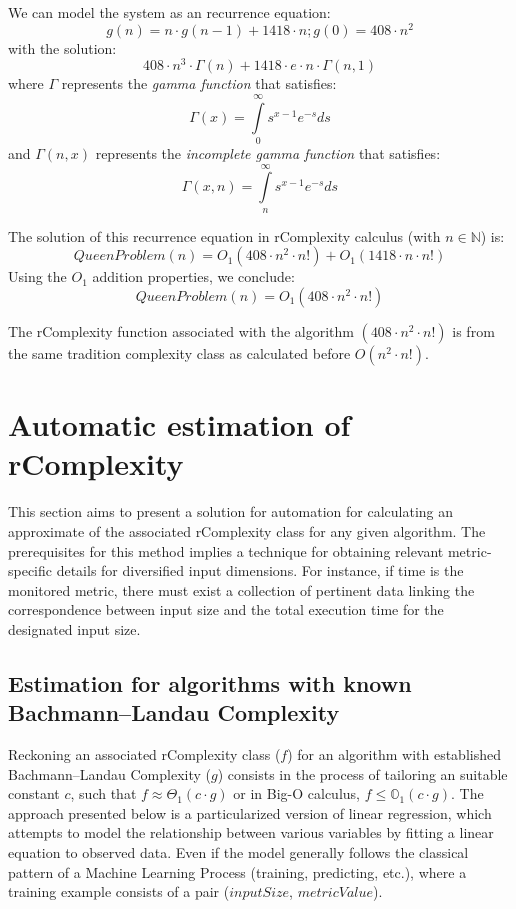 We can model the system as an recurrence equation:
\[ g(n) = n \cdot  g(n-1) + 1418 \cdot  n; g(0) = 408 \cdot  n^{2} \]
with the solution:
\[ 408 \cdot n^{3} \cdot \Gamma(n) + 1418 \cdot e \cdot  n \cdot \Gamma(n, 1)\]
where $\Gamma$ represents the \textit{gamma function} that satisfies: \[ \Gamma \left( x \right) = \int\limits_0^\infty {s^{x - 1} e^{ - s} ds} \] and $ \Gamma(n,x)$ represents the \textit{incomplete gamma function} that satisfies: \[ \Gamma \left(x, n \right) = \int\limits_n^\infty {s^{x - 1} e^{ - s} ds}\]

The solution of this recurrence equation in rComplexity calculus (with $n \in \mathbb{N}$) is:
\[ QueenProblem(n) = O_{1}(408 \cdot n^{2} \cdot n!) + O_{1}(1418 \cdot n \cdot n!) \]
Using the $O_{1}$ addition properties, we conclude:
\[ QueenProblem(n) = O_{1}(408 \cdot n^{2} \cdot n!) \]

\begin{remark}
    The rComplexity function associated with the algorithm $(408 \cdot n^{2} \cdot n!)$ is from the same tradition complexity class as calculated before $ O(n^2\cdot n!)$.
\end{remark}


\section{Automatic estimation of rComplexity}
This section aims to present a solution for automation for calculating an approximate of the associated rComplexity class for any given algorithm. The prerequisites for this method implies a technique for obtaining relevant metric-specific details for diversified input dimensions. For instance, if time is the monitored metric, there must exist a collection of pertinent data linking the correspondence between input size and the total execution time for the designated input size.

\subsection{Estimation for algorithms with known Bachmann–Landau Complexity}
Reckoning an associated rComplexity class ($f$) for an algorithm with established Bachmann–Landau Complexity ($g$) consists in the process of tailoring an suitable constant $c$, such that $f \approx \Theta_{1}(c \cdot g)$ or in Big-O calculus, $f \leq  \mathbb{O}_{1} (c \cdot g)$. The approach presented below is a particularized version of linear regression, which attempts to model the relationship between various variables by fitting a linear equation to observed data. Even if the model generally follows the classical pattern of a Machine Learning Process (training, predicting, etc.), where a training example consists of a pair ($inputSize$, $metricValue$).

